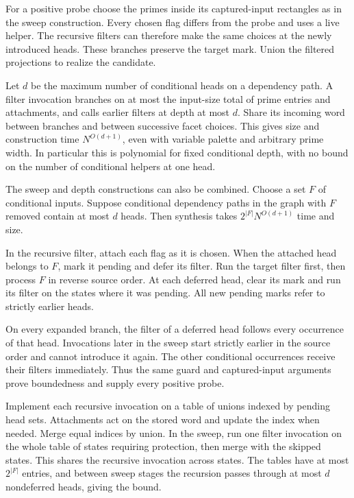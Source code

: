 For a positive probe choose the primes
inside its captured-input rectangles
as in the sweep construction. Every
chosen flag differs from the probe
and uses a live helper. The recursive
filters can therefore make the same
choices at the newly introduced
heads. These branches preserve the
target mark. Union the filtered
projections to realize the candidate.

Let $d$ be the maximum number of
conditional heads on a dependency
path. A filter invocation branches
on at most the input-size total of
prime entries and attachments, and
calls earlier filters at depth at
most $d$. Share its incoming word
between branches and between
successive facet choices. This
gives size and construction time
$N^{O(d+1)}$, even with variable
palette and arbitrary prime width.
In particular this is polynomial
for fixed conditional depth,
with no bound on the number of
conditional helpers at one head.

The sweep and depth constructions can
also be combined. Choose a set $F$ of
conditional inputs. Suppose conditional
dependency paths in the graph with $F$
removed contain at most $d$ heads.
Then synthesis takes $2^{|F|}N^{O(d+1)}$
time and size.

In the recursive filter, attach each flag
as it is chosen. When the attached head
belongs to $F$, mark it pending and defer
its filter. Run the target filter first,
then process $F$ in reverse source order.
At each deferred head, clear its mark and
run its filter on the states where it was
pending. All new pending marks refer to
strictly earlier heads.

On every expanded branch, the filter of a
deferred head follows every occurrence
of that head. Invocations later in the
sweep start strictly earlier in the source
order and cannot introduce it again.
The other conditional occurrences receive
their filters immediately. Thus the same
guard and captured-input arguments prove
boundedness and supply every positive probe.

Implement each recursive invocation on a
table of unions indexed by pending head
sets. Attachments act on the stored word
and update the index when needed. Merge
equal indices by union. In the sweep, run
one filter invocation on the whole table
of states requiring protection, then merge
with the skipped states. This shares the
recursive invocation across states. The
tables have at most $2^{|F|}$ entries, and
between sweep stages the recursion passes
through at most $d$ nondeferred heads,
giving the bound.

